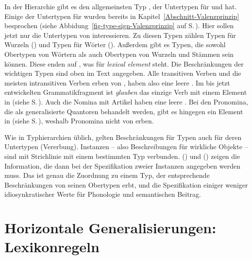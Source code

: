 In der Hierarchie gibt es den allgemeinsten Typ , der Untertypen für  und
 hat. Einige der Untertypen für  wurden bereits in
Kapitel~\ref{Abschnitt-Valenzprinzip} besprochen (siehe Abbidung~\ref{fig-type-sign-Valenzprinzip}
auf S.\,\pageref{fig-type-sign-Valenzprinzip}). Hier sollen jetzt nur die Untertypen von
 interessieren. Zu diesen Typen zählen Typen für Wurzeln () und Typen
für Wörter (). Außerdem gibt es Typen, die sowohl Obertypen von Wörtern als auch
Obertypen von Wurzeln und Stämmen sein können. Diese enden auf , was für \emph{lexical element}
steht. Die Beschränkungen der wichtigen Typen sind oben im Text angegeben. Alle transitiven Verben
und die meisten intransitiven Verben erben von , haben also eine leere
\hconsl. Im bis jetzt entwickelten Grammatikfragment ist \emph{glauben} das einzige Verb mit einem
Element in \hcons (siehe S.\,\pageref{le-glauben}). Auch die Nomina mit Artikel haben eine leere \hconsl. Bei
den Pronomina, die als generalisierte Quantoren behandelt werden, gibt es hingegen ein Element in
\hcons (siehe S.\,\pageref{Lexikoneintrag-er}), weshalb Pronomina nicht von  erben.

Wie in Typhierarchien üblich, gelten Beschränkungen für Typen auch für deren Untertypen (Vererbung).
Instanzen -- also Beschreibungen für wirkliche Objekte -- sind mit Strichlinie mit einem bestimmten Typ verbunden.
() und () zeigen die Information, die dann bei der Spezifikation zweier Instanzen angegeben
werden muss. Das ist genau die Zuordnung zu einem Typ, der entsprechende Beschränkungen von seinen
Obertypen erbt, und die Spezifikation einiger weniger idiosynkratischer Werte für Phonologie
und semantischen Beitrag.
\ea
{}
\z
\ea
{}
\z
{}



\section{Horizontale Generalisierungen: Lexikonregeln}
\label{sec-lr}


